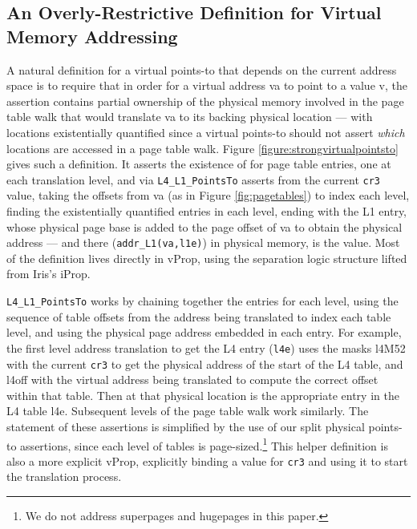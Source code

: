 \subsection{An Overly-Restrictive Definition for Virtual Memory Addressing}
\label{sec:overly-restrictive}
A natural definition for a virtual points-to that depends on the current address space is to
require that in order for a virtual address \textsf{va} to point to a value \textsf{v}, the assertion contains
partial ownership of the physical memory involved in the page table walk that would translate \textsf{va} to
its backing physical location --- with locations existentially quantified since a virtual points-to should not assert
\emph{which} locations are accessed in a page table walk.
Figure \ref{figure:strongvirtualpointsto} gives such a definition.
It asserts the existence of for page table entries, one at each translation level, and via \lstinline|L4_L1_PointsTo|
asserts from the current \lstinline|cr3| value, taking the offsets from \textsf{va} (as in Figure \ref{fig:pagetables})
to index each level, finding the existentially quantified entries in each level, 
ending with the L1 entry, whose physical page base is added to the page offset of \textsf{va} to obtain the physical address
 --- and there (\lstinline|addr_L1(va,l1e)|) in physical memory, is the value.
Most of the definition lives directly in \textsf{vProp}, using the separation logic structure lifted from Iris's \textsf{iProp}.

\lstinline|L4_L1_PointsTo| works by
chaining together the entries for each level, using the sequence of table offsets from the address being translated to index
each table level, and using the physical page address embedded in each entry.
For example, 
  the first level address translation to get the L4 entry (\lstinline|l4e|) 
  uses the masks \textsf{l4M52} with the current \lstinline|cr3| to get the 
  physical address of the start of the L4 table,
  and \textsf{l4off} with the virtual address being translated to compute the correct offset within that table.
  Then at that physical location is the appropriate entry in the L4 table \textsf{l4e}.
  Subsequent levels of the page table walk work similarly.
The statement of these assertions is simplified by the use of our split physical points-to assertions, since
each level of tables is page-sized.\footnote{We do not address superpages and hugepages in this paper.}
This helper definition is also a more explicit \textsf{vProp}, explicitly binding a value for \lstinline|cr3| and using it
to start the translation process.


